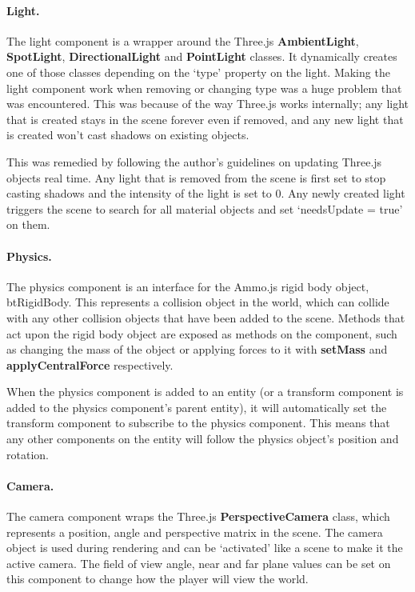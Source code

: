 	\paragraph{Light.}
	The light component is a wrapper around the Three.js \textbf{AmbientLight}, \textbf{SpotLight}, \textbf{DirectionalLight} and \textbf{PointLight} classes. It dynamically creates one of those classes depending on the `type' property on the light. Making the light component work when removing or changing type was a huge problem that was encountered. This was because of the way Three.js works internally; any light that is created stays in the scene forever even if removed, and any new light that is created won't cast shadows on existing objects.

	This was remedied by following the author's guidelines on updating Three.js objects real time. Any light that is removed from the scene is first set to stop casting shadows and the intensity of the light is set to 0. Any newly created light triggers the scene to search for all material objects and set `needsUpdate = true' on them.


	\paragraph{Physics.}
	The physics component is an interface for the Ammo.js rigid body object, btRigidBody. This represents a collision object in the world, which can collide with any other collision objects that have been added to the scene. Methods that act upon the rigid body object are exposed as methods on the component, such as changing the mass of the object or applying forces to it with \textbf{setMass} and \textbf{applyCentralForce} respectively.

	When the physics component is added to an entity (or a transform component is added to the physics component's parent entity), it will automatically set the transform component to subscribe to the physics component. This means that any other components on the entity will follow the physics object's position and rotation.

	\paragraph{Camera.}
	The camera component wraps the Three.js \textbf{PerspectiveCamera} class, which represents a position, angle and perspective matrix in the scene. The camera object is used during rendering and can be `activated' like a scene to make it the active camera. The field of view angle, near and far plane values can be set on this component to change how the player will view the world.

